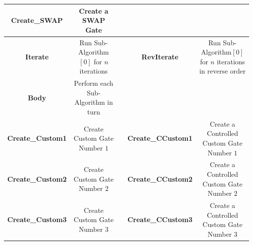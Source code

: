 \begin{landscape}
\begin{tabular}{|c|c|c|c|c|}
\hline
\textbf{Create\_SWAP} & Create a SWAP Gate & &  &  \\
\hline
\textbf{Iterate} & Run Sub-Algorithm$[0]$ for $n$ iterations & & \textbf{RevIterate} & Run Sub-Algorithm$[0]$ for $n$ iterations in reverse order\\
\hline
\textbf{Body} & Perform each Sub-Algorithm in turn & & & \\
\hline
\textbf{Create\_Custom1} & Create Custom Gate Number $1$ & & \textbf{Create\_CCustom1} & Create a Controlled Custom Gate Number $1$ \\
\hline
\textbf{Create\_Custom2} & Create Custom Gate Number $2$ & & \textbf{Create\_CCustom2} & Create a Controlled Custom Gate Number $2$ \\
\hline
\textbf{Create\_Custom3} & Create Custom Gate Number $3$ & & \textbf{Create\_CCustom3} & Create a Controlled Custom Gate Number $3$ \\
\hline
\end{tabular}
\clearpage
\end{landscape}